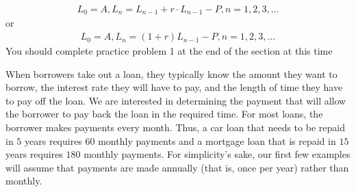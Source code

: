 \documentclass[10pt,]{book}
\theoremstyle{ptxdefinitionnotitle}
\theoremstyle{ptxdefinitiontitle}
\theoremstyle{ptxdefinitionnotitle}
\theoremstyle{ptxdefinitiontitle}
\theoremstyle{ptxdefinitionnotitle}
\theoremstyle{ptxdefinitiontitle}
\numberwithin{equation}{section}
\begin{document}
%
\begin{gather*}
L_0=A, L_n=L_{n-1} + r \cdot L_{n-1} - P , n=1,2,3,...
\end{gather*}
\hypertarget{p-44}{}%
or%
%
\begin{gather}
L_0=A,L_n=(1+r)L_{n-1} - P , n=1,2,3,...\label{recursive-loan-equation}
\end{gather}
\hypertarget{p-45}{}%
You should complete practice problem 1 at the end of the section at this time%
\par
\hypertarget{p-46}{}%
When borrowers take out a loan, they typically know the amount they want to borrow, the interest rate they will have to pay, and the length of time they have to pay off the loan.  We are interested in determining the payment that will allow the borrower to pay back the loan in the required time.  For most loans, the borrower makes payments every month. Thus, a car loan that needs to be repaid in \(5\) years requires \(60\) monthly payments and a mortgage loan that is repaid in \(15\) years requires \(180\) monthly payments. For simplicity's sake, our first few examples will assume that payments are made annually (that is, once per year) rather than monthly.%
\end{document}
